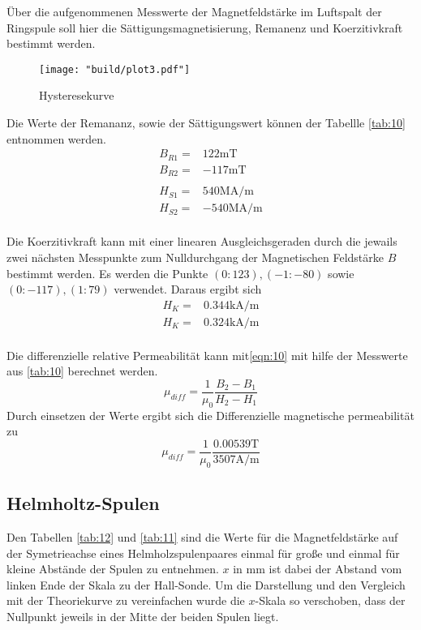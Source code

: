 Über die aufgenommenen Messwerte der Magnetfeldstärke im Luftspalt der Ringspule soll hier 
die Sättigungsmagnetisierung, Remanenz und Koerzitivkraft bestimmt werden.
\begin{figure}[H]
    \caption{Hysteresekurve}
    \label{fig:3}
    \centering
    \texttt{[image: "build/plot3.pdf"]}
\end{figure}
\noindent Die Werte der Remananz, sowie der Sättigungswert können der Tabellle 
\autoref{tab:10} entnommen werden.
\begin{align*}
    B_{R1} =& 122 \unit{\milli\tesla}\\
    B_{R2} =& -117 \unit{\milli\tesla}\\
&\\
    H_{S1} =& 540 \unit{\mega\ampere\per\meter}\\
    H_{S2} =& -540 \unit{\mega\ampere\per\meter}\\
\end{align*}

\noindent Die Koerzitivkraft kann mit einer linearen Ausgleichsgeraden durch die jewails zwei nächsten 
Messpunkte zum Nulldurchgang der Magnetischen Feldstärke $B $ bestimmt werden. Es werden die Punkte
$(0:123),(-1:-80)$ sowie $(0:-117),(1:79)$ verwendet. Daraus ergibt sich
\begin{align*}
    H_{K} =& 0.344 \unit{\kilo\ampere\per\meter}\\
    H_{K} =& 0.324 \unit{\kilo\ampere\per\meter}\\
\end{align*}

\noindent Die differenzielle relative Permeabilität kann mit\autoref{eqn:10}
mit hilfe der Messwerte aus \autoref{tab:10} berechnet werden. 
\begin{equation}
    \mu_{diff} = \frac{1}{\mu_0} \frac{B_2 - B_1}{H_2 - H_1}
\end{equation}
\noindent Durch einsetzen der Werte ergibt sich die Differenzielle magnetische permeabilität zu
\begin{equation}
    \mu_{diff} = \frac{1}{\mu_0} \frac{0.00539 \unit{\tesla}}{3507 \unit{\ampere\per\meter}}
\end{equation}





\subsection{Helmholtz-Spulen}
Den Tabellen \autoref{tab:12} und \autoref{tab:11} sind die Werte für die Magnetfeldstärke auf der 
Symetrieachse eines Helmholzspulenpaares einmal für große und einmal für kleine 
Abstände der Spulen zu entnehmen. $x$ in $\unit{\milli\meter} $ ist dabei der
Abstand vom linken Ende der Skala zu der Hall-Sonde. Um die Darstellung und den Vergleich mit der 
Theoriekurve zu vereinfachen wurde die $x$-Skala so verschoben, dass der Nullpunkt
jeweils in der Mitte der beiden Spulen liegt.

